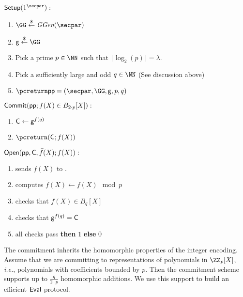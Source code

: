 \documentclass{article}
\theoremstyle{definition}
\begin{document}
\begin{mdframed}[userdefinedwidth=\textwidth]
\begin{minipage}{\textwidth}
	\begin{flushleft}
	$\pro{Setup}(1^\secpar):$
		\begin{enumerate}[nolistsep]
			\item $ \GG \sample \ggen(\secpar)$
			\item $ \gr{g} \sample \GG$
			\item Pick a prime $p\in \NN$ such that $\lceil\log_2(p)\rceil=\lambda$.
			\item Pick a sufficiently large and odd $q\in \NN$ (See discussion above)
			\item $\pcreturn \params = (\secpar,\GG,\gr{g},p,q)$
		\end{enumerate}
	$\textsf{{Commit}}(\textsf{pp};f(X) \in B_{2\cdot p}[X]):$ 
		\begin{enumerate}[nolistsep]
			\item $\mathsf{C} \gets \mathsf{g}^{f(q)}$
			\item $\pcreturn (\gr{C};f(X))$
		\end{enumerate}
	$\textsf{{Open}}(\textsf{pp},\mathsf{C},\bar{f}(X);f(X)):$ 
		\begin{enumerate}[nolistsep]
		    \item \prover sends $f(X)$ to \verifier.
		    				\item \verifier computes $\bar{f}(X) \gets f(X) \mod p$
		    \item \verifier checks that $f(X)\in B_{q}[X]$
			\item \verifier checks that $\mathsf{g}^{f(q)} = \mathsf{C}$ 
			\item \pcif all checks pass \textbf{then} \pcreturn $1$ \textbf{else} \pcreturn $0$
		\end{enumerate}
		\end{flushleft}
\end{minipage}
\end{mdframed}
The commitment inherits the homomorphic properties of the integer encoding. Assume that we are committing to representations of polynomials in $\ZZ_p[X]$, \emph{i.e.}, polynomials with coefficients bounded by $p$. Then the commitment scheme supports up to $\frac{q}{2 \cdot p}$ homomorphic additions. We use this support to build an efficient $\textsf{{Eval}}$ protocol. 
\end{document}
